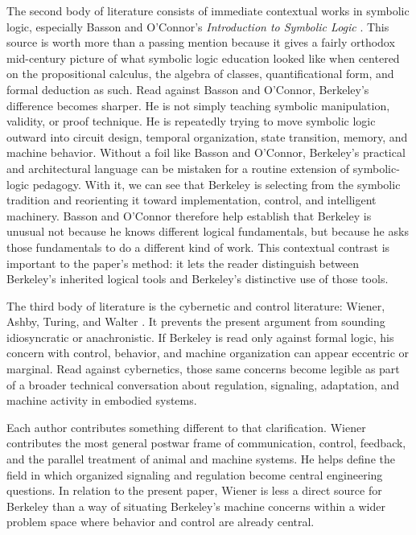 \documentclass[11pt]{article}
\begin{document}
The second body of literature consists of immediate contextual works in symbolic logic, especially Basson and O'Connor's \emph{Introduction to Symbolic Logic} \citep{basson1960introduction}. This source is worth more than a passing mention because it gives a fairly orthodox mid-century picture of what symbolic logic education looked like when centered on the propositional calculus, the algebra of classes, quantificational form, and formal deduction as such. Read against Basson and O'Connor, Berkeley's difference becomes sharper. He is not simply teaching symbolic manipulation, validity, or proof technique. He is repeatedly trying to move symbolic logic outward into circuit design, temporal organization, state transition, memory, and machine behavior. Without a foil like Basson and O'Connor, Berkeley's practical and architectural language can be mistaken for a routine extension of symbolic-logic pedagogy. With it, we can see that Berkeley is selecting from the symbolic tradition and reorienting it toward implementation, control, and intelligent machinery. Basson and O'Connor therefore help establish that Berkeley is unusual not because he knows different logical fundamentals, but because he asks those fundamentals to do a different kind of work. This contextual contrast is important to the paper's method: it lets the reader distinguish between Berkeley's inherited logical tools and Berkeley's distinctive use of those tools.

The third body of literature is the cybernetic and control literature: Wiener, Ashby, Turing, and Walter \citep{wiener1948cybernetics,ashby1952design,ashby1956introduction,turing1948intelligent,turing1950computing,walter1953living}. It prevents the present argument from sounding idiosyncratic or anachronistic. If Berkeley is read only against formal logic, his concern with control, behavior, and machine organization can appear eccentric or marginal. Read against cybernetics, those same concerns become legible as part of a broader technical conversation about regulation, signaling, adaptation, and machine activity in embodied systems.

Each author contributes something different to that clarification. Wiener contributes the most general postwar frame of communication, control, feedback, and the parallel treatment of animal and machine systems. He helps define the field in which organized signaling and regulation become central engineering questions. In relation to the present paper, Wiener is less a direct source for Berkeley than a way of situating Berkeley's machine concerns within a wider problem space where behavior and control are already central.
\end{document}
